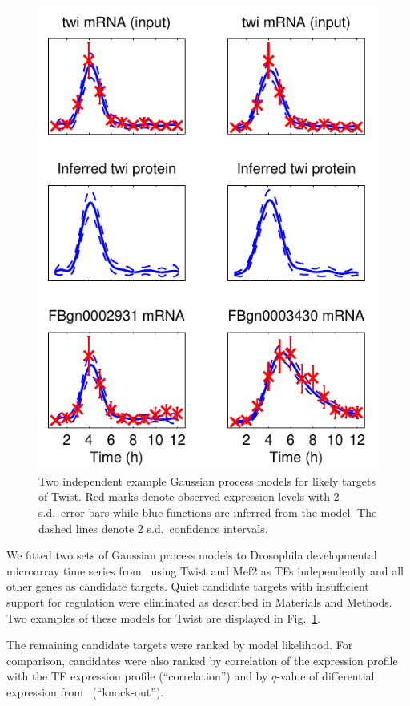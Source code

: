 \documentclass{pnastwo}
\begin{document}
\begin{article}
\begin{figure}[htb]
  \centering
  \includegraphics{gpdisim_models_twi}
  \caption{Two independent example Gaussian process models for likely
    targets of Twist. Red marks denote observed expression levels with
    2 s.d.\ error bars while blue functions are inferred from the
    model.  The dashed lines denote 2 s.d.\ confidence intervals.}
  \label{fig:gpdisim_models}
\end{figure}

We fitted two sets of Gaussian process models to Drosophila
developmental microarray time series from~\cite{Tomancak2002} using
Twist and Mef2 as TFs independently and all other genes as candidate
targets.  Quiet candidate targets with insufficient support for
regulation were eliminated as described in Materials and Methods.  Two
examples of these models for Twist are displayed in
Fig.~\ref{fig:gpdisim_models}.

The remaining candidate targets were ranked by model likelihood.  For
comparison, candidates were also ranked by correlation of the
expression profile with the TF expression profile (``correlation'')
and by $q$-value of differential expression
from~\cite{Sandmann2006a,Sandmann2007a} (``knock-out'').


\end{article}
\end{document}
